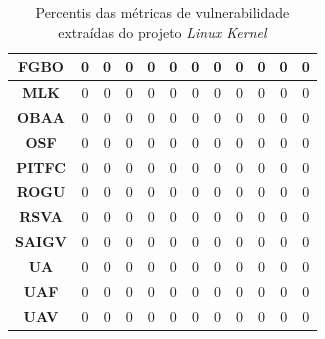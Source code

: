 \begin{table}[h]
{\begin{tabular}{cccccccccccc}
\textbf{FGBO}    & 0               & 0            & 0            & 0             & 0             & 0             & 0             & 0             & 0             & 0             & 0               \\ \hline
\rowcolor[HTML]{EFEFEF} 
\textbf{MLK}     & 0               & 0            & 0            & 0             & 0             & 0             & 0             & 0             & 0             & 0             & 0               \\ \hline
\textbf{OBAA}    & 0               & 0            & 0            & 0             & 0             & 0             & 0             & 0             & 0             & 0             & 0               \\ \hline
\rowcolor[HTML]{EFEFEF} 
\textbf{OSF}     & 0               & 0            & 0            & 0             & 0             & 0             & 0             & 0             & 0             & 0             & 0               \\ \hline
\textbf{PITFC}   & 0               & 0            & 0            & 0             & 0             & 0             & 0             & 0             & 0             & 0             & 0               \\ \hline
\rowcolor[HTML]{EFEFEF} 
\textbf{ROGU}    & 0               & 0            & 0            & 0             & 0             & 0             & 0             & 0             & 0             & 0             & 0               \\ \hline
\textbf{RSVA}    & 0               & 0            & 0            & 0             & 0             & 0             & 0             & 0             & 0             & 0             & 0               \\ \hline
\rowcolor[HTML]{EFEFEF} 
\textbf{SAIGV}   & 0               & 0            & 0            & 0             & 0             & 0             & 0             & 0             & 0             & 0             & 0               \\ \hline
\textbf{UA}      & 0               & 0            & 0            & 0             & 0             & 0             & 0             & 0             & 0             & 0             & 0               \\ \hline
\rowcolor[HTML]{EFEFEF} 
\textbf{UAF}     & 0               & 0            & 0            & 0             & 0             & 0             & 0             & 0             & 0             & 0             & 0               \\ \hline
\textbf{UAV}     & 0               & 0            & 0            & 0             & 0             & 0             & 0             & 0             & 0             & 0             & 0               \\ \hline
\end{tabular}
}
\caption{Percentis das métricas de vulnerabilidade extraídas do projeto \emph{Linux Kernel}}
\label{tab:percentis}
\end{table}


